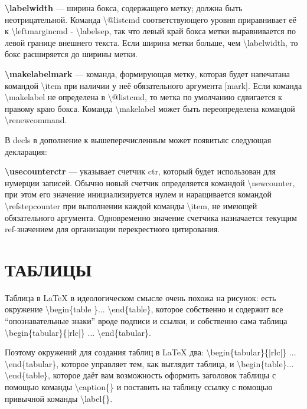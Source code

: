 \documentclass[a4paper,14pt,russian]{extreport}
\begin{document}
\textbf{\textbackslash labelwidth} --- ширина бокса, содержащего метку; должна быть неотрицательной. Команда \textbackslash @listcmd соответствующего уровня приравнивает её к \textbackslash leftmargincmd - \textbackslash labelsep, так что левый край бокса метки выравнивается по левой границе внешнего текста. Если ширина метки больше, чем \textbackslash labelwidth, то бокс расширяется до ширины метки.

\textbf{\textbackslash makelabel{mark}} --- команда, формирующая метку, которая будет напечатана командой \textbackslash item при наличии у неё обязательного аргумента [mark]. Если команда \textbackslash makelabel не определена в \textbackslash @listcmd, то метка по умолчанию сдвигается к правому краю бокса. Команда \textbackslash makelabel может быть переопределена командой \textbackslash renewcommand.

В decls в дополнение к вышеперечисленным может появитьяс следующая декларация:

\textbf{\textbackslash usecounter{ctr}} --- указывает счетчик ctr, который будет использован для нумерции записей. Обычно новый счетчик определяется командой \textbackslash newcounter, при этом его значение инициализируется нулем и наращивается командой \textbackslash refstepcounter при выполнении каждой команды \textbackslash item, не имеющей обязательного аргумента. Одновременно значение счетчика назначается текущим ref-значением для организации перекрестного цитирования.













\chapter{ТАБЛИЦЫ}
Таблица в LaTeX в идеологическом смысле очень похожа на рисунок: есть окружение \textbackslash begin\{table \}... \textbackslash end\{table\}, которое собственно и содержит все ``опознавательные знаки'' вроде подписи и ссылки, и собственно сама таблица \textbackslash begin\{tabular\}\{|rlc|\} ... \textbackslash end\{tabular\}.

Поэтому окружений для создания таблиц в LaTeX два: \textbackslash begin\{tabular\}\{|rlc|\} ... \textbackslash end\{tabular\}, которое управляет тем, как выглядит таблица, и \textbackslash begin\{table\}... \textbackslash end\{table\}, которое даёт вам возможность оформить заголовок таблицы с помощью команды \textbackslash caption\{\} и поставить на таблицу ссылку с помощью привычной команды \textbackslash label\{\}.
\end{document}
